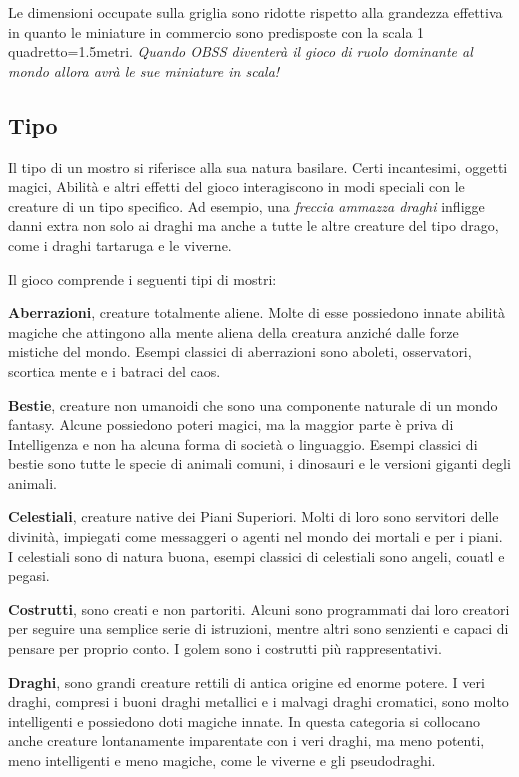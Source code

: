 \medskip

Le dimensioni occupate sulla griglia sono ridotte rispetto alla grandezza effettiva in quanto le miniature in commercio sono predisposte con la scala 1 quadretto=1.5metri. \textit{Quando OBSS diventerà il gioco di ruolo dominante al mondo allora avrà le sue miniature in scala!}

\begin{multicols}{2}

\subsection{Tipo}

Il tipo di un mostro si riferisce alla sua natura basilare. Certi incantesimi, oggetti magici, Abilità e altri effetti del gioco interagiscono in modi speciali con le creature di un tipo specifico. Ad esempio, una \textit{freccia ammazza draghi} infligge danni extra non solo ai draghi ma anche a tutte le altre creature del tipo drago, come i draghi tartaruga e le viverne.

Il gioco comprende i seguenti tipi di mostri:

\smallskip\textbf{Aberrazioni}, creature totalmente aliene. Molte di esse possiedono innate abilità magiche che attingono alla mente aliena della creatura anziché dalle forze mistiche del mondo. Esempi classici di aberrazioni sono aboleti, osservatori, scortica mente e i batraci del caos.

\smallskip\textbf{Bestie}, creature non umanoidi che sono una componente naturale di un mondo fantasy. Alcune possiedono poteri magici, ma la maggior parte è priva di Intelligenza e non ha alcuna forma di società o linguaggio. Esempi classici di bestie sono tutte le specie di animali comuni, i dinosauri e le versioni giganti degli animali.

\smallskip\textbf{Celestiali}, creature native dei Piani Superiori. Molti di loro sono servitori delle divinità, impiegati come messaggeri o agenti nel mondo dei mortali e per i piani.\\
I celestiali sono di natura buona, esempi classici di celestiali sono angeli, couatl e pegasi.

\smallskip\textbf{Costrutti}, sono creati e non partoriti. Alcuni sono programmati dai loro creatori per seguire una semplice serie di istruzioni, mentre altri sono senzienti e capaci di pensare per proprio conto. I golem sono i costrutti più rappresentativi.

\smallskip\textbf{Draghi}, sono grandi creature rettili di antica origine ed enorme potere. I veri draghi, compresi i buoni draghi metallici e i malvagi draghi cromatici, sono molto intelligenti e possiedono doti magiche innate. In questa categoria si collocano anche creature lontanamente imparentate con i veri draghi, ma meno potenti, meno intelligenti e meno magiche, come le viverne e gli pseudodraghi.


\end{multicols}
